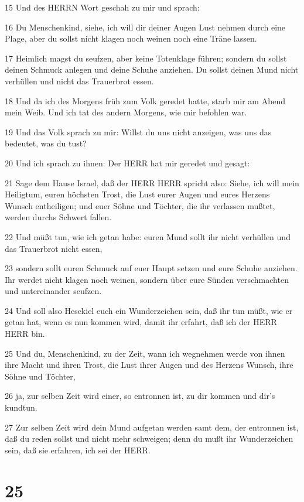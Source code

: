 \par 15 Und des HERRN Wort geschah zu mir und sprach:
\par 16 Du Menschenkind, siehe, ich will dir deiner Augen Lust nehmen durch eine Plage, aber du sollst nicht klagen noch weinen noch eine Träne lassen.
\par 17 Heimlich magst du seufzen, aber keine Totenklage führen; sondern du sollst deinen Schmuck anlegen und deine Schuhe anziehen. Du sollst deinen Mund nicht verhüllen und nicht das Trauerbrot essen.
\par 18 Und da ich des Morgens früh zum Volk geredet hatte, starb mir am Abend mein Weib. Und ich tat des andern Morgens, wie mir befohlen war.
\par 19 Und das Volk sprach zu mir: Willst du uns nicht anzeigen, was uns das bedeutet, was du tust?
\par 20 Und ich sprach zu ihnen: Der HERR hat mir geredet und gesagt:
\par 21 Sage dem Hause Israel, daß der HERR HERR spricht also: Siehe, ich will mein Heiligtum, euren höchsten Trost, die Lust eurer Augen und eures Herzens Wunsch entheiligen; und euer Söhne und Töchter, die ihr verlassen mußtet, werden durchs Schwert fallen.
\par 22 Und müßt tun, wie ich getan habe: euren Mund sollt ihr nicht verhüllen und das Trauerbrot nicht essen,
\par 23 sondern sollt euren Schmuck auf euer Haupt setzen und eure Schuhe anziehen. Ihr werdet nicht klagen noch weinen, sondern über eure Sünden verschmachten und untereinander seufzen.
\par 24 Und soll also Hesekiel euch ein Wunderzeichen sein, daß ihr tun müßt, wie er getan hat, wenn es nun kommen wird, damit ihr erfahrt, daß ich der HERR HERR bin.
\par 25 Und du, Menschenkind, zu der Zeit, wann ich wegnehmen werde von ihnen ihre Macht und ihren Trost, die Lust ihrer Augen und des Herzens Wunsch, ihre Söhne und Töchter,
\par 26 ja, zur selben Zeit wird einer, so entronnen ist, zu dir kommen und dir's kundtun.
\par 27 Zur selben Zeit wird dein Mund aufgetan werden samt dem, der entronnen ist, daß du reden sollst und nicht mehr schweigen; denn du mußt ihr Wunderzeichen sein, daß sie erfahren, ich sei der HERR.

\chapter{25}

